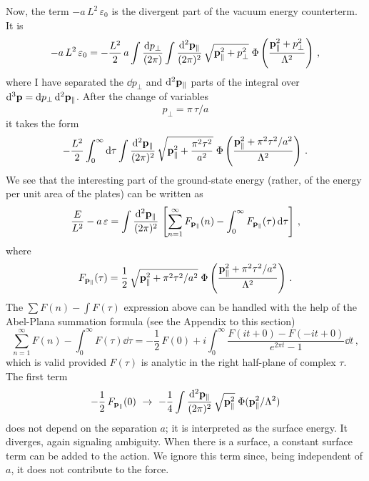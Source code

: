 Now, the term $-a\,L^2\,\varepsilon_0$ is the divergent part of the vacuum
energy counterterm. It is
\[
-a\,L^2\,\varepsilon_0=-\frac{L^2}{2}\,a\int\frac{\mathop{}\!\mathrm{d} p_\perp}{(2\pi)}\int\frac{\mathop{}\!\mathrm{d}^2\mathbf{p}_\parallel}{(2\pi)^2}\,
\sqrt{\mathbf{p}_\parallel^2+p_\perp^2}\;\Phi\left(\frac{\mathbf{p}_\parallel^2+p_\perp^2}{\Lambda^2}\right)\,,
\]
where I have separated the $\dd p_\perp$ and $\mathop{}\!\mathrm{d}^2\mathbf{p}_\parallel$ parts of the
integral over $\mathop{}\!\mathrm{d}^3\mathbf{p}=\mathop{}\!\mathrm{d} p_\perp\mathop{}\!\mathrm{d}^2\mathbf{p}_\parallel$. After the change of
variables
\[
p_\perp=\pi\,\tau/a
\]
it takes the form
\[
-\frac{L^2}{2}\int_0^\infty \mathop{}\!\mathrm{d}\tau\int\frac{\mathop{}\!\mathrm{d}^2\mathbf{p}_\parallel}{(2\pi)^2}\,
\sqrt{\mathbf{p}_\parallel^2+\frac{\pi^2\tau^2}{a^2}}\;\Phi\left(\frac{\mathbf{p}_\parallel^2+\pi^2\tau^2/a^2}{\Lambda^2}\right)\,.
\]
We see that the interesting part of the ground-state energy (rather, of the
energy per unit area of the plates) can be written as
\[
\frac{E}{L^2}-a\,\varepsilon=\int\frac{\mathop{}\!\mathrm{d}^2\mathbf{p}_\parallel}{(2\pi)^2}\,
\left[\sum_{n=1}^\infty F_{\mathbf{p}_\parallel}(n)-\int_0^\infty F_{\mathbf{p}_\parallel}(\tau)\mathop{}\!\mathrm{d}\tau\right]\,,
\]
where
\[
F_{\mathbf{p}_\parallel}(\tau)=\frac12\,\sqrt{\mathbf{p}_\parallel^2+\pi^2\tau^2/a^2}\;\Phi\left(\frac{\mathbf{p}_\parallel^2+\pi^2\tau^2/a^2}{\Lambda^2}\right)\,.
\]
The $\sum F(n)-\int F(\tau)$ expression above can be handled with the help of
the Abel-Plana summation formula (see the Appendix to this section)
\begin{equation}\label{eq:AbelPlana}
\sum_{n=1}^\infty F(n)-\int_0^\infty F(\tau)\dd\tau
=-\frac12\,F(0)+i\int_0^\infty\frac{F(it+0)-F(-it+0)}{e^{2\pi t}-1}\dd t\,,
\end{equation}
which is valid provided $F(\tau)$ is analytic in the right half-plane of
complex $\tau$. The first term
\[
-\frac12\,F_{\pp_\parallel}(0)\ \to\ -\frac14\int\frac{\dd^2\pp_\parallel}{(2\pi)^2}\,
\sqrt{\pp_\parallel^2}\;\Phi(\pp_\parallel^2/\Lambda^2)
\]
does not depend on the separation $a$; it is interpreted as the surface
energy. It diverges, again signaling ambiguity. When there is a surface, a
constant surface term can be added to the action. We ignore this term since,
being independent of $a$, it does not contribute to the force.

